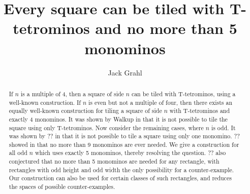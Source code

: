 \documentclass{article}
\title{Every square can be tiled with T-tetrominos and no more than 5 monominos}
\author{Jack Grahl}
\begin{document}
\maketitle

\begin{abstract}
If $n$ is a multiple of 4, then a square of side $n$ can be tiled with T-tetrominos, using a well-known construction. If $n$ is even but not a multiple of four, then there exists an equally well-known construction for tiling a square of side $n$ with T-tetrominos and exactly 4 monominos.
It was shown by Walkup in \cite{walkup} that it is not possible to tile the square using only T-tetrominos. Now consider the remaining cases, where $n$ is odd. It was shown by ?? in \cite{who?} that it is not possible to tile a square using only one monomino. ?? showed in \cite{??} that no more than 9 monominos are ever needed. We give a construction for all odd $n$ which uses exactly 5 monominos, thereby resolving the question. ?? also conjectured that no more than 5 monominos are needed for any rectangle, with rectangles with odd height and odd width the only possibility for a counter-example. Our construction can also be used for certain classes of such rectangles, and reduces the spaces of possible counter-examples.
\end{abstract}
{}

\end{document}
